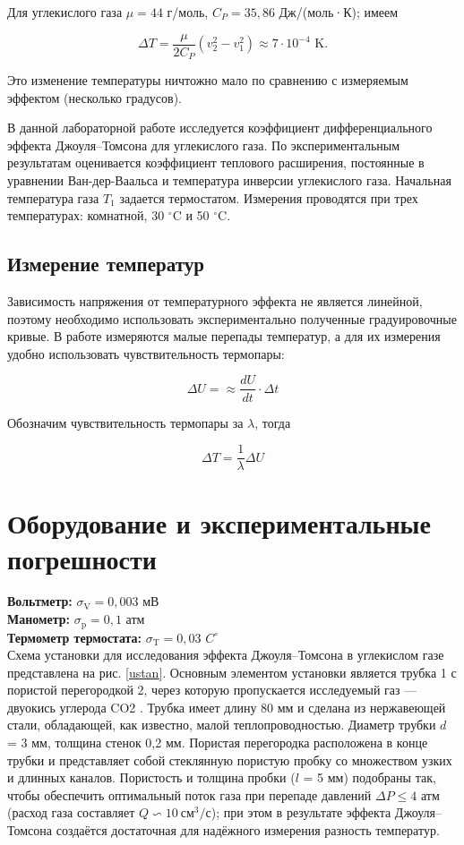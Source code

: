 \documentclass[a4paper,12pt]{article}
\begin{document}
Для углекислого газа $ \mu = 44 $ г/моль, $ C_P = 35,86 $ Дж/(моль·К); имеем

\[ \Delta T = \frac{\mu}{2C_P}\left(v_2^2-v_1^2\right) \approx 7\cdot10^{-4} \text{ K}. \]

Это изменение температуры ничтожно мало по сравнению с измеряемым эффектом (несколько градусов).

В данной лабораторной работе исследуется коэффициент дифференциального эффекта Джоуля–Томсона для углекислого газа. По экспериментальным результатам оценивается коэффициент теплового расширения, постоянные в уравнении Ван-дер-Ваальса и температура инверсии углекислого газа. Начальная температура газа $ T_1 $ задается термостатом. Измерения проводятся при трех температурах: комнатной, 30 $ ^\circ $C и 50 $ ^\circ $C.

\subsection{Измерение температур}

Зависимость напряжения от температурного эффекта не является линейной, поэтому необходимо использовать экспериментально полученные градуировочные кривые. В работе измеряются малые перепады температур, а для их измерения удобно использовать чувствительность термопары:

\begin{equation}
    \Delta U =\approx \frac{d U}{dt} \cdot \Delta t
\end{equation}

Обозначим чувствительность термопары за $\lambda$, тогда

\begin{equation}\label{T-from-U}
    \Delta T = \frac{1}{\lambda} \Delta U
\end{equation}


\section{Оборудование и экспериментальные погрешности}

\textbf{Вольтметр:} $\sigma_\text{V} = 0,003$ мВ \\
\textbf{Манометр:} $\sigma_\text{p} = 0,1$ атм \\
\textbf{Термометр термостата:} $\sigma_\text{T} = 0,03$ $C^\circ$ \\

Схема установки для исследования эффекта Джоуля–Томсона в углекислом газе представлена на рис. \ref{ustan}. Основным элементом установки является трубка 1 с пористой перегородкой 2, через которую пропускается исследуемый газ — двуокись углерода CO2 . Трубка имеет длину 80 мм и сделана из нержавеющей стали, обладающей, как известно, малой теплопроводностью. Диаметр трубки $d$ = 3 мм, толщина стенок 0,2 мм. Пористая перегородка расположена в конце трубки и представляет собой стеклянную пористую пробку со множеством узких и длинных каналов. Пористость и толщина пробки ($l$ = 5 мм) подобраны так, чтобы обеспечить оптимальный поток газа при перепаде давлений $\Delta P \le 4$ атм (расход газа составляет $Q \backsim 10 \ \text{см}^3/\text{с}$); при этом в результате эффекта Джоуля–Томсона создаётся достаточная для надёжного измерения разность температур.
\end{document}
